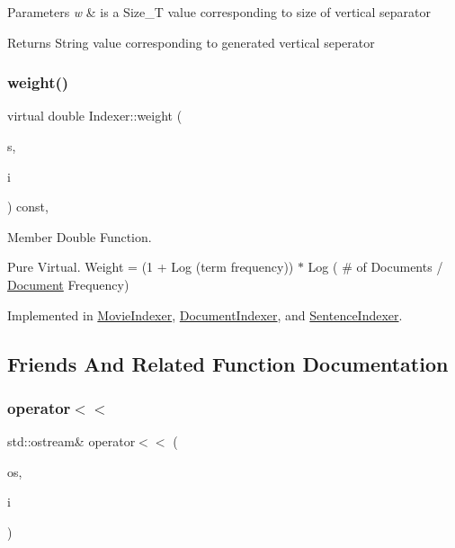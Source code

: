 \begin{DoxyParams}{Parameters}
{\em w} & is a Size\+\_\+T value corresponding to size of vertical separator \\
\hline
\end{DoxyParams}
\begin{DoxyReturn}{Returns}
String value corresponding to generated vertical seperator 
\end{DoxyReturn}
\mbox{\label{class_indexer_a8301fcbdf40afd926ab71d4767575d32}} 
\subsubsection{\texorpdfstring{weight()}{weight()}}
{\footnotesize\ttfamily virtual double Indexer\+::weight (\begin{DoxyParamCaption}\item[{const std\+::string \&}]{s,  }\item[{int}]{i }\end{DoxyParamCaption}) const\hspace{0.3cm}{\ttfamily [protected]}, {}}



Member Double Function. 

Pure Virtual. Weight = (1 + Log (term frequency)) $\ast$ Log ( \# of Documents / \hyperlink{class_document}{Document} Frequency) 

Implemented in \hyperlink{class_movie_indexer_a3caddb617dd3324b6535a22aff8ea987}{Movie\+Indexer}, \hyperlink{class_document_indexer_aa637e8bce87c52d0d78bfebe8af02f13}{Document\+Indexer}, and \hyperlink{class_sentence_indexer_ad436ab76195615090de457b50aabfe7b}{Sentence\+Indexer}.



\subsection{Friends And Related Function Documentation}
\mbox{\label{class_indexer_a09373f25959741150437b95f15ae11e2}} 
\subsubsection{\texorpdfstring{operator$<$$<$}{operator<<}}
{\footnotesize\ttfamily std\+::ostream\& operator$<$$<$ (\begin{DoxyParamCaption}\item[{std\+::ostream \&}]{os,  }\item[{const \hyperlink{class_document_indexer}{Document\+Indexer} \&}]{i }\end{DoxyParamCaption})\hspace{0.3cm}{\ttfamily [friend]}}


